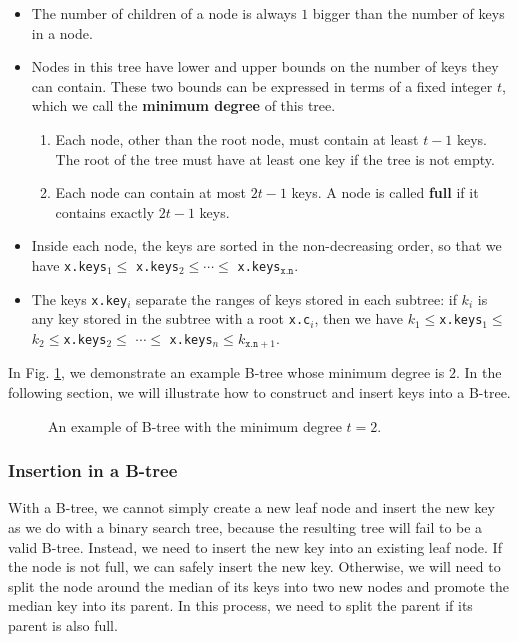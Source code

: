 \begin{itemize}
\item The number of children of a node is always $1$ bigger than the number of keys in a node.
\item Nodes in this tree have lower and upper bounds on the number of keys they can contain. These two bounds can be expressed in terms of a fixed integer $t$, which we call the \textbf{minimum degree} of this tree.
	\begin{enumerate}
		\item Each node, other than the root node, must contain at least $t-1$ keys. The root of the tree must have at least one key if the tree is not empty.
		\item Each node can contain at most $2t-1$ keys. A node is called \textbf{full} if it contains exactly $2t-1$ keys.
	\end{enumerate}
\item Inside each node, the keys are sorted in the non-decreasing order, so that we have \texttt{x.keys$_1\leq $} \texttt{x.keys$_2\leq \cdots \leq$} \texttt{x.keys$_{\texttt{x.n}}$}.
\item The keys \texttt{x.key$_i$} separate the ranges of keys stored in each subtree: if $k_i$ is any key stored in the subtree with a root \texttt{x.c$_i$}, then we have $k_1\leq$\texttt{x.keys$_1\leq $}$ k_2\leq$\texttt{x.keys$_2\leq $} $\cdots\leq$ \texttt{x.keys$_n\leq $}$k_{\texttt{x.n}+1}$.
\end{itemize}

In Fig. \ref{fig: B-tree}, we demonstrate an example B-tree whose minimum degree is $2$. In the following section, we will illustrate how to construct and insert keys into a B-tree.

\begin{figure}
\centering

\caption{An example of B-tree with the minimum degree $t=2$.}
\label{fig: B-tree}
\end{figure}

\subsubsection{Insertion in a B-tree}

With a B-tree, we cannot simply create a new leaf node and insert the new key as we do with a binary search tree, because the resulting tree will fail to be a valid B-tree. Instead, we need to insert the new key into an existing leaf node. If the node is not full, we can safely insert the new key. Otherwise, we will need to split the node around the median of its keys into two new nodes and promote the median key into its parent. In this process, we need to split the parent if its parent is also full.

